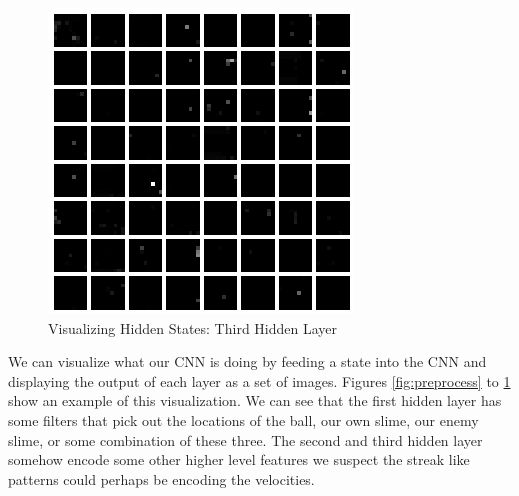 \documentclass[10pt,twocolumn,letterpaper]{article}
\begin{document}
\begin{figure}[H]
\center
\includegraphics[width=\columnwidth]{layer3}
\caption{
Visualizing Hidden States: Third Hidden Layer
}\label{fig:layer3}
\end{figure}

We can visualize what our CNN is doing by feeding a state into the CNN and
displaying the output of each layer as a set of images. Figures \ref{fig:preprocess}
to \ref{fig:layer3} show an example of this visualization. We can see that
the first hidden layer has some filters that pick out the locations of the ball,
our own slime, our enemy slime, or some combination of these three. The second
and third hidden layer somehow encode some other higher level features we
suspect the streak like patterns could perhaps be encoding the velocities.

{\small


}
\end{document}
